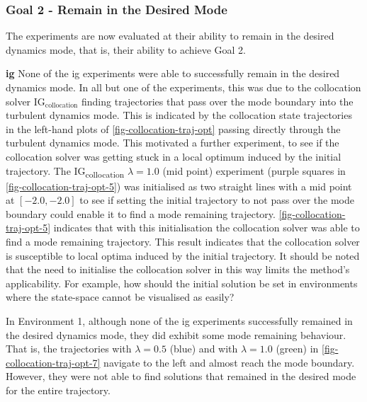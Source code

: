\documentclass{mimosis-class/mimosis}
\numberwithin{equation}{chapter}
\begin{document}
{\subsubsection{Goal 2 - Remain in the Desired Mode}
\label{sec:org76d9463}
The experiments are now evaluated at their ability to remain in the desired dynamics mode,
that is, their ability to achieve Goal 2.
\newline

\textbf{\acrfull{ig}}
None of the \acrshort{ig} experiments were able to successfully remain in the desired dynamics mode.
In all but one of the experiments, this was due to the collocation solver
\(\text{IG}_{\text{collocation}}\) finding trajectories that pass over the mode boundary into
the turbulent dynamics mode.
This is indicated by the collocation state trajectories in the left-hand plots of \cref{fig-collocation-traj-opt}
passing directly through the turbulent dynamics mode.
This motivated a further experiment, to see if the collocation solver was getting stuck in a local optimum
induced by the initial trajectory.
The IG\textsubscript{collocation} \(\lambda=1.0\) (mid point) experiment
(purple squares in \cref{fig-collocation-traj-opt-5}) was initialised as two straight lines with a
mid point at \([-2.0, -2.0]\) to see if
setting the initial trajectory to not pass over the mode boundary could enable it to find a mode remaining
trajectory.
\cref{fig-collocation-traj-opt-5} indicates that with this initialisation the collocation solver was able to
find a mode remaining trajectory.
This result indicates that the collocation solver is susceptible to local optima induced by the initial trajectory.
It should be noted that the need to initialise the collocation solver in this way
limits the method's applicability.
For example, how should the initial solution be set in environments where the state-space cannot
be visualised as easily?

In Environment 1, although none of the \acrshort{ig}
experiments successfully remained in the desired dynamics mode, they did exhibit some mode remaining behaviour.
That is, the trajectories with \(\lambda=0.5\) (blue) and with \(\lambda=1.0\) (green) in \cref{fig-collocation-traj-opt-7}
navigate to the left and almost reach the mode boundary.
However, they were not able to find solutions that remained in the desired mode for the entire trajectory.



}
\end{document}
